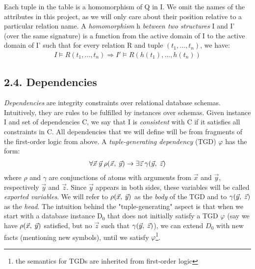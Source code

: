 \documentclass[11pt, a4paper, dvipsnames]{article}
\begin{document}
\noindent Each tuple in the table is a homomorphism of Q in I. We omit the names of the attributes in this project, as we will only care about their position relative to a particular relation name.\newline
A \textit{homomorphism} h \textit{between two structures} I and I' (over the same signature) is a function from the active domain of I to the active domain of I' such that for every relation R and tuple $(t_{1}, ..., t_{n})$, we have:
\begin{gather*}
I \vDash R(t_{1}, ..., t_{n}) \Rightarrow  I' \vDash R(h(t_{1}), ..., h(t_{n}))
\end{gather*}

\subsection{2.4. Dependencies}
\textit{Dependencies} are integrity constraints over relational database schemas. Intuitively, they are rules to be fulfilled by instances over schemas. Given instance I and set of dependencies C, we say that I is \textit{consistent} with C if it satisfies all constraints in C. All dependencies that we will define will be from fragments of the first-order logic from above.\newline
A \textit{tuple-generating dependency} (TGD) $\varphi$ has the form:
\begin{gather}
\forall \vec{x} \hspace{0.25em}\vec{y} \hspace{0.25em}\rho(\vec{x}, \hspace{0.25em}\vec{y}) \rightarrow \exists \vec{z} \hspace{0.25em}\gamma(\vec{y}, \hspace{0.25em}\vec{z})
\end{gather}
where $\rho$ and $\gamma$ are conjunctions of atoms with arguments from $\vec{x}$ and $\vec{y}$, respectively $\vec{y}$ and $\vec{z}$. Since $\vec{y}$ appears in both sides, these variables will be called \textit{exported variables}. We will refer to $\rho(\vec{x}, \hspace{0.25em} \vec{y})$ as the \textit{body} of the TGD and to $\gamma(\vec{y}, \hspace{0.25em}\vec{z})$ as the \textit{head}.\newline
The intuition behind the "tuple-generating" aspect is that when we start with a database instance D$_{0}$ that does not initially satisfy a TGD $\varphi$ (say we have $\rho(\vec{x}, \hspace{0.25em} \vec{y})$ satisfied, but no $\vec{z}$ such that $\gamma(\vec{y}, \hspace{0.25em}\vec{z})$), we can extend $D_{0}$ with new facts (mentioning new symbols), until we satisfy $\varphi$\footnote{the semantics for TGDs are inherited from first-order logic}.\newline
\end{document}
